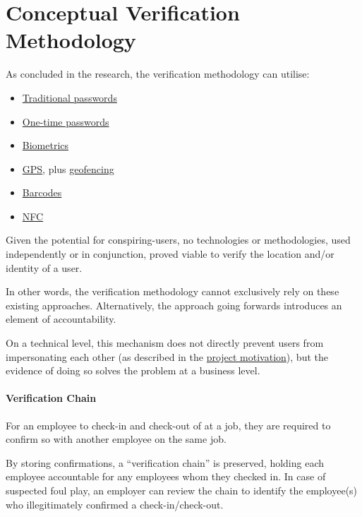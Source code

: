 \section{Conceptual Verification Methodology}
\label{s:concept}

As concluded in the research, the verification methodology
can utilise: 

\begin{itemize} 

  \item \hyperref[ss:passwords]{Traditional passwords}

  \item \hyperref[ss:otp]{One-time passwords}

  \item \hyperref[ss:biometrics]{Biometrics}

  \item \hyperref[ss:gps]{GPS}, plus
        \hyperref[ss:geofencing]{geofencing} 

  \item \hyperref[ss:barcodes]{Barcodes} 

  \item \hyperref[ss:nfc]{NFC} 

\end{itemize} 

Given the potential for \gls{conspiring-users}, no
technologies or methodologies, used independently or in
conjunction, proved viable to verify the location and/or
identity of a user.

In other words, the verification methodology cannot
exclusively rely on these existing approaches.
Alternatively, the approach going forwards introduces an
element of accountability.

On a technical level, this mechanism does not directly
prevent users from impersonating each other (as described
in the \hyperref[s:motivation]{project motivation}), but
the evidence of doing so solves the problem at a business
level.

\paragraph{Verification Chain}

For an employee to \gls{check-in} and \gls{check-out} of at
a job, they are required to confirm so with another
employee on the same job.

By storing confirmations, a \enquote{verification chain} is
preserved, holding each employee accountable for any
employees whom they checked in.
In case of suspected foul play, an employer can review the
chain to identify the employee(s) who illegitimately
confirmed a check-in/check-out.

